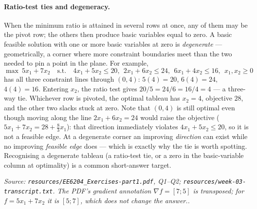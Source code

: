 \documentclass[11pt,a4paper]{article}
\renewcommand{\texttt}[1]{\nolinkurl{#1}}
\newcommand{\source}[1]{\par\smallskip\noindent\textit{Source: #1.}\par\smallskip}
\begin{document}
\paragraph{Ratio-test ties and degeneracy.} When the minimum ratio is attained in several rows at once, any of them may be the pivot row; the others then produce basic variables equal to zero. A basic feasible solution with one or more basic variables at zero is \emph{degenerate} --- geometrically, a corner where more constraint boundaries meet than the two needed to pin a point in the plane. For example,
\[
 \max\ 5x_1+7x_2\quad\text{s.t.}\quad 4x_1+5x_2\leq20,\ \ 2x_1+6x_2\leq24,\ \ 6x_1+4x_2\leq16,\ \ x_1,x_2\geq0
\]
has all three constraint lines through $(0,4)$: $5(4)=20$, $6(4)=24$, $4(4)=16$. Entering $x_2$, the ratio test gives $20/5=24/6=16/4=4$ --- a three-way tie. Whichever row is pivoted, the optimal tableau has $x_2=4$, objective $28$, and the other two slacks stuck at zero. Note that $(0,4)$ is still optimal even though moving along the line $2x_1+6x_2=24$ would raise the objective ($5x_1+7x_2=28+\tfrac83x_1$): that direction immediately violates $4x_1+5x_2\leq20$, so it is not a feasible edge. At a degenerate corner an improving \emph{direction} can exist while no improving \emph{feasible edge} does --- which is exactly why the tie is worth spotting. Recognising a degenerate tableau (a ratio-test tie, or a zero in the basic-variable column at optimality) is a common short-answer target.
\source{\texttt{resources/EE6204\_Exercises-part1.pdf}, Q1--Q2; \texttt{resources/week-03-transcript.txt}. The PDF's gradient annotation $\nabla f=[7;5]$ is transposed; for $f=5x_1+7x_2$ it is $[5;7]$, which does not change the answer.}
\end{document}
